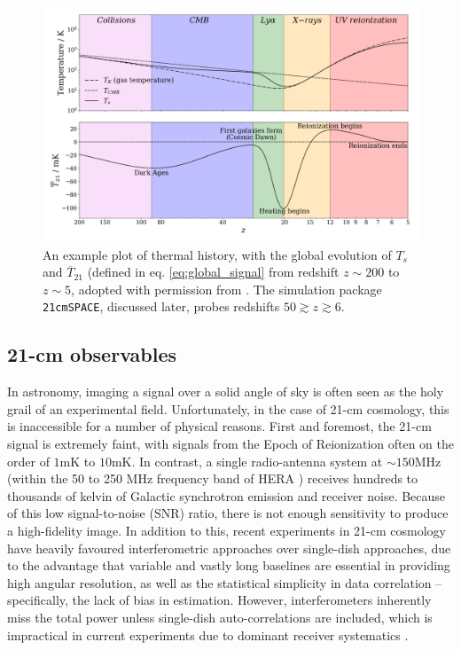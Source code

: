 \documentclass[floats,floatfix,showpacs,amssymb,prd,superscriptaddress,nofootinbib, 11pt]{revtex4-2} %
\newcommand{\code}{\texttt}
\newcommand{\red}{\textcolor{red}}
\begin{document}
\begin{figure}[H]
    \centering
    \includegraphics[width=0.7\columnwidth]{images/Example21cm.png}
    \caption{An example plot of thermal history, with the global evolution of $T_s$ and $\overline{T}_{21}$ (defined in eq. \ref{eq:global_signal} from redshift $z \sim 200$ to $z \sim 5$, adopted with permission from \citet{dhandha_2022}. The simulation package \code{21cmSPACE}, discussed later, probes redshifts $50 \gtrsim z \gtrsim 6$.}
    \label{fig:example_21cm}
\end{figure}

\subsection{21-cm observables}

In astronomy, imaging a signal over a solid angle of sky is often seen as the holy grail of an experimental field. Unfortunately, in the case of 21-cm cosmology, this is inaccessible for a number of physical reasons. First and foremost, the 21-cm signal is extremely faint, with signals from the Epoch of Reionization often on the order of $1 \text{mK}$ to $10 \text{mK}$.
In contrast, a single radio-antenna system at  $\sim 150 \text{MHz}$ (within the 50 to 250 MHz frequency band of HERA \citep{DeBoer_2017}) receives hundreds to thousands of kelvin of Galactic synchrotron emission and receiver noise. Because of this low signal-to-noise (SNR) ratio, there is not enough sensitivity to produce a high-fidelity image. In addition to this, recent experiments in 21-cm cosmology have heavily favoured interferometric approaches over single-dish approaches, due to the advantage that variable and vastly long baselines are essential in providing high angular resolution, as well as the statistical simplicity in data correlation -- specifically, the lack of bias in estimation. However, interferometers inherently miss the total power unless single-dish auto-correlations are included, which is impractical in current experiments due to dominant receiver systematics \citep{Liu_Shaw_2020}.
\end{document}
